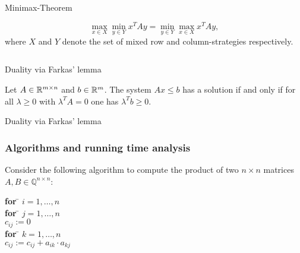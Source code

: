 \begin{frame}{Minimax-Theorem}



  \begin{theorem}
  \label{d:thr:7}
  \begin{displaymath}
   \max_{x \in X} \min_{y\in Y} x^TA y = \min_{y\in Y} \max_{x\in X}
   x^TAy,       
  \end{displaymath}
  where $X$ and $Y$ denote the set of mixed row and column-strategies
  respectively. 
\end{theorem}
   \begin{columns}
    \begin{column}{.5\textwidth}
      
    \end{column}
    \begin{column}{.5\textwidth}
      
    \end{column}       
  \end{columns}
\end{frame}


\begin{frame}{}
  
\end{frame}



\begin{frame}{Duality  via Farkas' lemma}

  
\begin{theorem}
\label{dual:thr:2farkas}
    Let $A \in \mathbb{R}^{m\times n}$ and $b \in \mathbb{R}^m$. The system $Ax\leq b$ has a
    solution if and only if for all $\lambda\geq0$ with $\lambda^TA =0$ one has
    $\lambda^Tb\geq0$. 
\end{theorem}

  
\end{frame}
\begin{frame}{Duality  via Farkas' lemma}


\end{frame}


\begin{frame}
  \frametitle{Algorithms and running time analysis}

  Consider the following algorithm to compute the product of two $n × n$ matrices $A,B ∈ ℚ^{n ×n}$: 
    \begin{tabbing}            
    {\bf for} \= $i=1,\dots,n$ \\ 
              \> {\bf for} \= $j=1,\dots,n$ \\
              \> \> $c_{ij} := 0$ \\
              \> \> {\bf for} \= $k=1,\dots,n$ \\
              \> \> \> $c_{ij} := c_{ij} + a_{ik} ⋅ a_{kj}$
            \end{tabbing} 
%
\end{frame}

